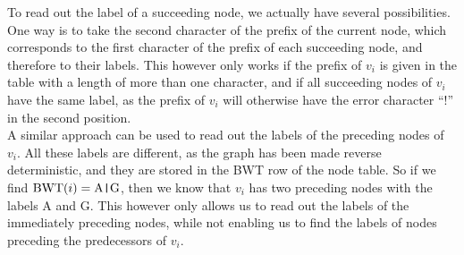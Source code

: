 \documentclass[a4paper,12pt,twoside,BCOR=10mm]{scrbook}
\def\pipe{\texttt{|}}
\begin{document}
To read out the label of a succeeding node, we actually have several possibilities. 
One way is to take the second character of the prefix of the current node, 
which corresponds to the first character of the prefix of each succeeding node, 
and therefore to their labels. This however only works if the prefix of $ v_i $ is 
given in the table with a length of more than one character, and if all succeeding nodes 
of $ v_i $ have the same label, as the prefix of $ v_i $ will otherwise have the 
error character “!” in the second position. \\
A similar approach can be used to read out the labels of the preceding nodes of $ v_i $. 
All these labels are different, as the graph has been made reverse deterministic, 
and they are stored in the BWT row of the node table. So if we find $ \textrm{BWT} ( i ) = \textrm{A{\pipe}G} $, 
then we know that $ v_i $ has two preceding nodes with the labels A and G. 
This however only allows us to read out the labels of the immediately preceding nodes, 
while not enabling us to find the labels of nodes preceding the predecessors of $ v_i $.
\end{document}
